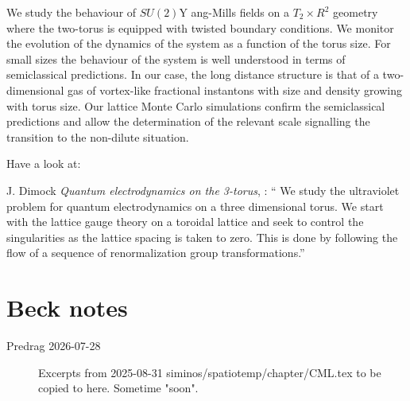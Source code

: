 \begin{description}
We study the behaviour of $SU(2)$Y ang-Mills fields on a  $T_2×R^2$ geometry where the two-torus is equipped with twisted boundary conditions. We monitor the evolution of the dynamics of the system as a function of the torus size. For small sizes the behaviour of the system is well understood in terms of semiclassical predictions. In our case, the long distance structure is that of a two-dimensional gas of vortex-like fractional instantons with size and density growing with  torus size. Our lattice Monte Carlo simulations confirm the semiclassical predictions and allow the determination of the relevant scale signalling the transition to the non-dilute situation. 

%
%


\item[2025-04-14 Predrag] Have a look at:

J. Dimock
{\em Quantum electrodynamics on the 3-torus},
:
`` We study the ultraviolet problem for quantum electrodynamics on a 
three dimensional torus. We start with the lattice gauge theory on a 
toroidal lattice and seek to control the singularities as the lattice 
spacing is taken to zero. This is done by following the flow of a 
sequence of renormalization group transformations.'' 


\end{description}

\section{Beck notes}
\label{s:Beck}

\begin{description}
	\item[Predrag 2026-07-28]
Excerpts from 2025-08-31 siminos/spatiotemp/chapter/CML.tex
to be copied to here. Sometime "soon".
\end{description}






\printbibliography[heading=subbibintoc,title={References}]
